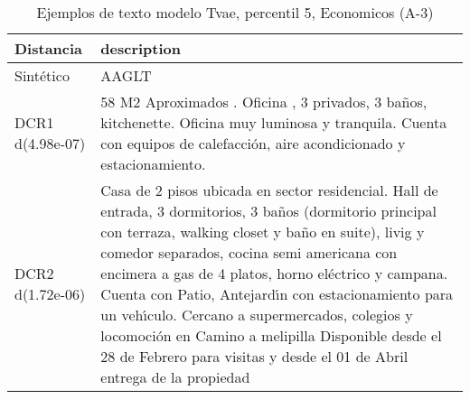 \begin{table}[H]
\centering
\fontsize{10}{14}\selectfont
\caption{Ejemplos de texto modelo Tvae, percentil 5, Economicos (A-3)}
\label{table-example-economicos-a-3-tvae-5p-text}
\begin{tabular}{|l|m{35em}|}
\hline
\rowcolor[gray]{0.8}
Distancia & description \\
\hline Sintético & AAGLT \\
\hline DCR1 d(4.98e-07) & 58 M2 Aproximados . Oficina , 3 privados, 3 ba\~nos, kitchenette. Oficina muy luminosa y tranquila. Cuenta con equipos de calefacci\'on, aire acondicionado y estacionamiento. \\
\hline DCR2 d(1.72e-06) & Casa de 2 pisos ubicada en sector residencial. Hall de entrada, 3 dormitorios, 3 ba\~nos (dormitorio principal con terraza, walking closet y ba\~no en suite), livig y comedor separados, cocina semi americana con encimera a gas de 4 platos, horno el\'ectrico y campana.  Cuenta con Patio, Antejard{\'\i}n con estacionamiento para un veh{\'\i}culo.  Cercano a supermercados, colegios y locomoci\'on en Camino a melipilla Disponible desde el 28 de Febrero para visitas y desde el 01 de Abril entrega de la propiedad \\
\hline
\end{tabular}
\end{table}
